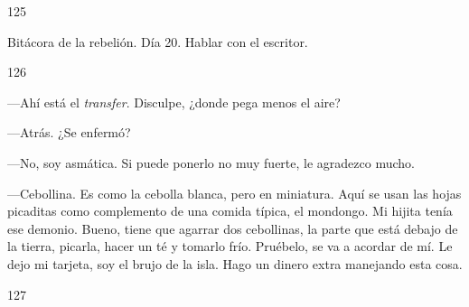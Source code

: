 \documentclass[12pt,twoside,openright,a5paper]{book}
\begin{document}
\vspace{0.5cm}

\hrulefill \hspace{0.1cm}\decofourleft\hspace{0.2cm} 125 \hspace{0.2cm}\decofourright \hspace{0.1cm}\hrulefill

\nopagebreak

\vspace{0.5cm}

\nopagebreak

Bitácora de la rebelión. Día 20. Hablar con el escritor.

\vspace{0.5cm}

\hrulefill \hspace{0.1cm}\decofourleft\hspace{0.2cm} 126 \hspace{0.2cm}\decofourright \hspace{0.1cm}\hrulefill

\nopagebreak

\vspace{0.5cm}

\nopagebreak

---Ahí está el \emph{transfer}. Disculpe, ¿donde pega menos el aire?

---Atrás. ¿Se enfermó?

---No, soy asmática. Si puede ponerlo no muy fuerte, le agradezco mucho.

---Cebollina. Es como la cebolla blanca, pero en miniatura. Aquí se usan las
hojas picaditas como complemento de una comida típica, el mondongo. Mi
hijita tenía ese demonio. Bueno, tiene que agarrar
dos cebollinas, la parte que está debajo de la tierra, picarla, hacer
un té y tomarlo frío. Pruébelo, se va a acordar de mí. Le dejo mi tarjeta,
soy el brujo de la isla. Hago un dinero extra manejando esta cosa.

\vspace{0.5cm}

\hrulefill \hspace{0.1cm}\decofourleft\hspace{0.2cm} 127 \hspace{0.2cm}\decofourright \hspace{0.1cm}\hrulefill

\nopagebreak

\vspace{0.5cm}
\end{document}
